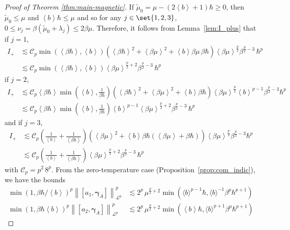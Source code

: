 \documentclass[11pt]{amsart}
\theoremstyle{plain}
\theoremstyle{definition}
\renewcommand	{\L}		{\mathcal L}		%
\newcommand		{\lt}			{\left}				%
\newcommand		{\rt}			{\right}			%
\renewcommand	{\(}			{\lt(}
\renewcommand	{\)}			{\rt)}
\newcommand		{\bangle}[1]	{\lt\langle #1\rt\rangle}
\newcommand		{\weight}[1]	{\bangle{#1}}	%
\newcommand		{\com}[1]		{\lt[{#1}\rt]}		%
\newcommand		{\nrm}[1]		{\lt\lVert #1\rt\rVert}
\newcommand		{\Nrm}[2]		{\nrm{#1}_{#2}}
\newcommand		{\cC}			{\mathcal{C}}
\newcommand		{\opgam}	{{\boldsymbol{\gamma}}}	%
\begin{document}
	\begin{proof}[Proof of Theorem \ref{thm:main-magnetic}]
        If $\tilde{\mu}_0 = \mu - \lt(2\weight{b}+1\rt)\hbar \geq 0$, then $\tilde{\mu}_0 \leq \mu$ and $\weight{b}\hbar \leq \mu$ and so for any $j\in\set{1,2,3}$, $0\leq \nu_j = \beta\lt(\tilde{\mu}_0+\lambda_j\rt)\leq 2\beta\mu$. Therefore, it follows from Lemma~\ref{lem:I_plus} that if $j=1$,
        \begin{align*}
            I_+ &\lesssim \cC_p \min(\weight{\beta\hbar},\weight{b}) \lt(\weight{\beta\hbar}^2 + \weight{\beta\mu}^2 + \weight{b} \beta\mu\,\beta\hbar\rt) \weight{\beta\mu}^\frac{p}{2} \beta^{\frac{p}{2}-3}\, \hbar^p
            \\
            &\lesssim \cC_p \min(\weight{\beta\hbar},\weight{b})  \weight{\beta\mu}^{\frac{p}{2}+2}\beta^{\frac{p}{2}-3}\, \hbar^p
        \end{align*}
        if $j=2$,
        \begin{align*}
			I_+ &\lesssim \cC_p \weight{\beta\hbar} \min(\weight{b},\tfrac{1}{\beta\hbar}) \lt(\weight{\beta\hbar}^2 +\weight{\beta\mu}^2 + \weight{b}\beta\hbar \rt) \weight{\beta\mu}^\frac{p}{2} \weight{b}^{p-1} \beta^{\frac{p}{2}-3} \hbar^p
            \\
            &\lesssim \cC_p \weight{\beta\hbar} \min(\weight{b},\tfrac{1}{\beta\hbar}) \weight{b}^{p-1} \weight{\beta\mu}^{\frac{p}{2}+2} \beta^{\frac{p}{2}-3}\, \hbar^p
		\end{align*}
        and if $j=3$,
		\begin{align*}
			I_+ &\lesssim \cC_p \lt(\tfrac{1}{\weight{b}}+\tfrac{1}{\weight{\beta\hbar}}\rt) \lt(\weight{\beta\mu}^2 + \weight{b}\beta\hbar\lt(\weight{\beta\mu}+\beta\hbar\rt) \rt) \weight{\beta\mu}^\frac{p}{2} \beta^{\frac{p}{2}-3} \hbar^p
            \\
            &\lesssim \cC_p \lt(\tfrac{1}{\weight{b}}+\tfrac{1}{\weight{\beta\hbar}}\rt) \weight{\beta\mu}^{\frac{p}{2}+2} \beta^{\frac{p}{2}-3} \, \hbar^p
		\end{align*}
        with $\cC_p = p^2\,8^p$. From the zero-temperature case (Proposition~\ref{prop:com_indic}), we have the bounds
		\begin{align*}
			\min(1,\beta\hbar/\weight{b})^p \Nrm{\com{a_1,\opgam_A}}{\L^p}^p &\lesssim 2^p \, \mu^{\frac{p}{2}+2} \min(\langle b\rangle^{p-1}\hbar,\langle b\rangle^{-1}\beta^p\hbar^{p+1}) \,  
			\\
			\min(1,\beta\hbar\weight{b})^p \Nrm{\com{a_2,\opgam_{A}}}{\L^p}^p &\lesssim 2^p \, \mu^{\frac{p}{2}+2} \min(\weight{b}\hbar,\langle b\rangle^{p+1}\beta^p\hbar^{p+1}) 

\end{align*}
\end{proof}
\end{document}
